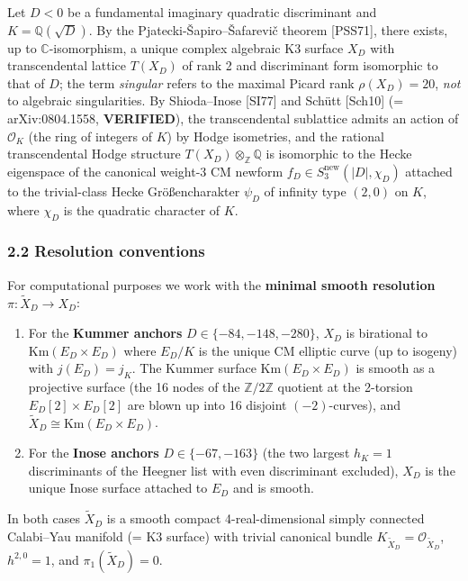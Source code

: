 \documentclass[
  11pt,
  a4paper,
]{amsart}
\begin{document}
Let \(D < 0\) be a fundamental imaginary quadratic discriminant and
\(K = \mathbb{Q}(\sqrt{D})\). By the Pjatecki-Šapiro--Šafarevič theorem {[}PSS71{]},
there exists, up to \(\mathbb{C}\)-isomorphism, a unique complex algebraic K3
surface \(X_D\) with transcendental lattice \(T(X_D)\) of rank 2 and discriminant
form isomorphic to that of \(D\); the term \emph{singular} refers to the maximal Picard
rank \(\rho(X_D) = 20\), \emph{not} to algebraic singularities. By Shioda--Inose {[}SI77{]}
and Schütt {[}Sch10{]} (= arXiv:0804.1558, \textbf{VERIFIED}), the transcendental sublattice
admits an action of \(\mathcal{O}_K\) (the ring of integers of \(K\)) by Hodge
isometries, and the rational transcendental Hodge structure
\(T(X_D) \otimes_{\mathbb{Z}} \mathbb{Q}\) is isomorphic to the Hecke eigenspace
of the canonical weight-3 CM newform \(f_D \in S_3^{\mathrm{new}}(|D|, \chi_D)\)
attached to the trivial-class Hecke Größencharakter \(\psi_D\) of infinity type
\((2,0)\) on \(K\), where \(\chi_D\) is the quadratic character of \(K\).

\hypertarget{resolution-conventions}{%
\subsubsection{2.2 Resolution conventions}\label{resolution-conventions}}

For computational purposes we work with the \textbf{minimal smooth resolution}
\(\pi : \widetilde{X}_D \to X_D\):

\begin{enumerate}
\def\labelenumi{(\alph{enumi})}
\item
  For the \textbf{Kummer anchors} \(D \in \{-84, -148, -280\}\), \(X_D\) is birational
  to \(\mathrm{Km}(E_D \times E_D)\) where \(E_D / K\) is the unique CM elliptic curve
  (up to isogeny) with \(j(E_D) = j_K\). The Kummer surface \(\mathrm{Km}(E_D \times E_D)\)
  is smooth as a projective surface (the 16 nodes of the \(\mathbb{Z}/2\mathbb{Z}\)
  quotient at the 2-torsion \(E_D[2] \times E_D[2]\) are blown up into 16 disjoint
  \((-2)\)-curves), and \(\widetilde{X}_D \cong \mathrm{Km}(E_D \times E_D)\).
\item
  For the \textbf{Inose anchors} \(D \in \{-67, -163\}\) (the two largest \(h_K = 1\)
  discriminants of the Heegner list with even discriminant excluded), \(X_D\) is
  the unique Inose surface attached to \(E_D\) and is smooth.
\end{enumerate}

In both cases \(\widetilde{X}_D\) is a smooth compact 4-real-dimensional simply
connected Calabi--Yau manifold (= K3 surface) with trivial canonical bundle
\(K_{\widetilde{X}_D} = \mathcal{O}_{\widetilde{X}_D}\), \(h^{2,0} = 1\), and
\(\pi_1(\widetilde{X}_D) = 0\).
\end{document}

